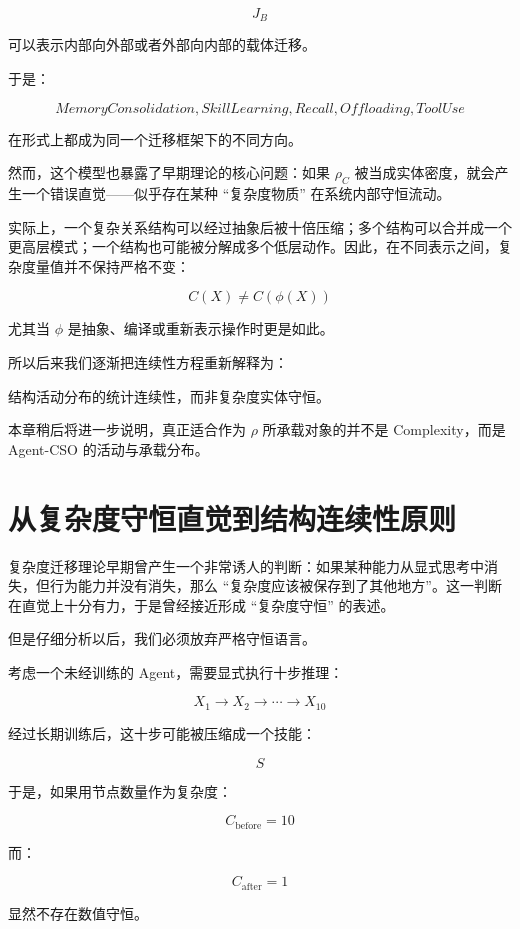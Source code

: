 \[
J_B
\]

可以表示内部向外部或者外部向内部的载体迁移。

于是：

\[
MemoryConsolidation,
SkillLearning,
Recall,
Offloading,
ToolUse
\]

在形式上都成为同一个迁移框架下的不同方向。

然而，这个模型也暴露了早期理论的核心问题：如果 $\rho_C$ 被当成实体密度，就会产生一个错误直觉——似乎存在某种 ``复杂度物质'' 在系统内部守恒流动。

实际上，一个复杂关系结构可以经过抽象后被十倍压缩；多个结构可以合并成一个更高层模式；一个结构也可能被分解成多个低层动作。因此，在不同表示之间，复杂度量值并不保持严格不变：

\[
C(X)
\neq
C(\phi(X))
\]

尤其当 $\phi$ 是抽象、编译或重新表示操作时更是如此。

所以后来我们逐渐把连续性方程重新解释为：

\begin{statementbox}
结构活动分布的统计连续性，而非复杂度实体守恒。
\end{statementbox}

本章稍后将进一步说明，真正适合作为 $\rho$ 所承载对象的并不是 Complexity，而是 Agent-CSO 的活动与承载分布。

\section{从复杂度守恒直觉到结构连续性原则}
\label{sec:structural-continuity}

复杂度迁移理论早期曾产生一个非常诱人的判断：如果某种能力从显式思考中消失，但行为能力并没有消失，那么 ``复杂度应该被保存到了其他地方''。这一判断在直觉上十分有力，于是曾经接近形成 ``复杂度守恒'' 的表述。

但是仔细分析以后，我们必须放弃严格守恒语言。

考虑一个未经训练的 Agent，需要显式执行十步推理：

\[
X_1\rightarrow X_2\rightarrow\cdots\rightarrow X_{10}
\]

经过长期训练后，这十步可能被压缩成一个技能：

\[
S
\]

于是，如果用节点数量作为复杂度：

\[
C_{\mathrm{before}}=10
\]

而：

\[
C_{\mathrm{after}}=1
\]

显然不存在数值守恒。

